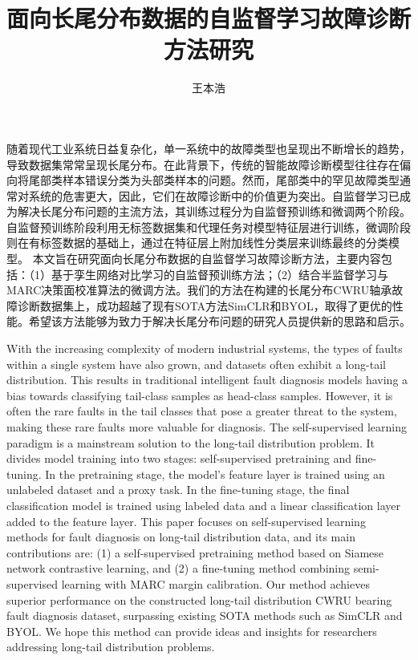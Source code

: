 \documentclass[master]{thesis-uestc}
\title{面向长尾分布数据的自监督学习故障诊断方法研究}{}
\author{王本浩}{Wang Benhao}
\begin{document}
\makecover

\begin{chineseabstract}
    随着现代工业系统日益复杂化，单一系统中的故障类型也呈现出不断增长的趋势，导致数据集常常呈现长尾分布。在此背景下，传统的智能故障诊断模型往往存在偏向将尾部类样本错误分类为头部类样本的问题。然而，尾部类中的罕见故障类型通常对系统的危害更大，因此，它们在故障诊断中的价值更为突出。自监督学习已成为解决长尾分布问题的主流方法，其训练过程分为自监督预训练和微调两个阶段。自监督预训练阶段利用无标签数据集和代理任务对模型特征层进行训练，微调阶段则在有标签数据的基础上，通过在特征层上附加线性分类层来训练最终的分类模型。
    本文旨在研究面向长尾分布数据的自监督学习故障诊断方法，主要内容包括：（1）基于孪生网络对比学习的自监督预训练方法；（2）结合半监督学习与MARC决策面校准算法的微调方法。我们的方法在构建的长尾分布CWRU轴承故障诊断数据集上，成功超越了现有SOTA方法SimCLR和BYOL，取得了更优的性能。希望该方法能够为致力于解决长尾分布问题的研究人员提供新的思路和启示。

\end{chineseabstract}

\begin{englishabstract}
    With the increasing complexity of modern industrial systems, the types of faults within a single system have also grown, and datasets often exhibit a long-tail distribution. This results in traditional intelligent fault diagnosis models having a bias towards classifying tail-class samples as head-class samples. However, it is often the rare faults in the tail classes that pose a greater threat to the system, making these rare faults more valuable for diagnosis. The self-supervised learning paradigm is a mainstream solution to the long-tail distribution problem. It divides model training into two stages: self-supervised pretraining and fine-tuning. In the pretraining stage, the model's feature layer is trained using an unlabeled dataset and a proxy task. In the fine-tuning stage, the final classification model is trained using labeled data and a linear classification layer added to the feature layer. This paper focuses on self-supervised learning methods for fault diagnosis on long-tail distribution data, and its main contributions are: (1) a self-supervised pretraining method based on Siamese network contrastive learning, and (2) a fine-tuning method combining semi-supervised learning with MARC margin calibration. Our method achieves superior performance on the constructed long-tail distribution CWRU bearing fault diagnosis dataset, surpassing existing SOTA methods such as SimCLR and BYOL. We hope this method can provide ideas and insights for researchers addressing long-tail distribution problems.

\end{englishabstract}
\end{document}

